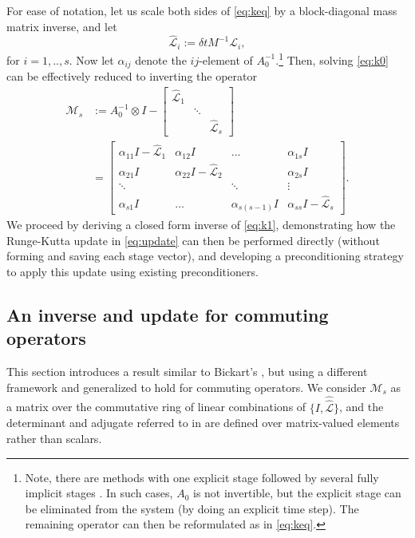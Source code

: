 \documentclass[review]{siamart}
\begin{document}
For ease of notation, let us scale both sides of \eqref{eq:keq} by a
block-diagonal mass matrix inverse, and let
%
\begin{equation*}
\widehat{\mathcal{L}}_i := \delta t M^{-1}\mathcal{L}_i,
\end{equation*}
%
for $i=1,..,s$. Now let $\alpha_{ij}$ denote the $ij$-element
of $A_0^{-1}$.\footnote{Note, there are
methods with one explicit stage followed by several fully implicit stages \cite{butcher00}.
In such cases, $A_0$ is not invertible, but the explicit stage can
be eliminated from the system (by doing an explicit time step). The remaining operator
can then be reformulated as in \eqref{eq:keq}.}
Then, solving \eqref{eq:k0} can be effectively reduced to inverting the operator
%
\begin{align}\nonumber
\mathcal{M}_s & := A_0^{-1}\otimes I - \begin{bmatrix} \widehat{\mathcal{L}}_1  & \\ & \ddots \\ && \widehat{\mathcal{L}}_s\end{bmatrix} \\
& = \begin{bmatrix} \alpha_{11}I - \widehat{\mathcal{L}}_1 & \alpha_{12}I & ... & \alpha_{1s}I \\
	\alpha_{21}I & \alpha_{22}I - \widehat{\mathcal{L}}_2 & & \alpha_{2s}I \\
	\ddots & & \ddots & \vdots \\ \alpha_{s1}I & ... & \alpha_{s(s-1)}I & \alpha_{ss}I - \widehat{\mathcal{L}}_s \end{bmatrix}.
	\label{eq:k1}
\end{align}
%
We proceed by deriving a closed form inverse of \eqref{eq:k1}, demonstrating
how the Runge-Kutta update in \eqref{eq:update} can then be performed directly
(without forming and saving each stage vector), and developing a preconditioning
strategy to apply this update using existing preconditioners.

\subsection{An inverse and update for commuting operators}\label{sec:solve:inv}

This section introduces a result similar to Bickart's \cite{bickart77},
but using a different framework and generalized to hold for commuting
operators. We consider $\mathcal{M}_s$ as a matrix over the commutative
ring of linear combinations of $\{I, \widehat{\widehat{\mathcal{L}}}\}$,
and the determinant and adjugate referred to in  are defined
over matrix-valued elements rather than scalars.
\end{document}
